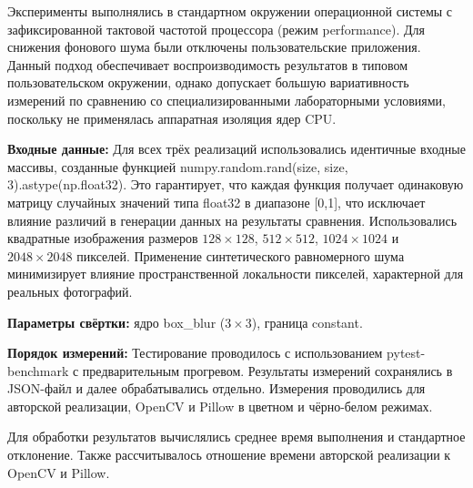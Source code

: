 \documentclass[a4paper, 12pt]{article}
\begin{document}
Эксперименты выполнялись в стандартном окружении операционной системы с зафиксированной тактовой частотой процессора (режим performance). Для снижения фонового шума были отключены пользовательские приложения. Данный подход обеспечивает воспроизводимость результатов в типовом пользовательском окружении, однако допускает большую вариативность измерений по сравнению со специализированными лабораторными условиями, поскольку не применялась аппаратная изоляция ядер CPU.

\textbf{Входные данные: } Для всех трёх реализаций использовались идентичные входные массивы, созданные функцией numpy.random.rand(size, size, 3).astype(np.float32). Это гарантирует, что каждая функция получает одинаковую матрицу случайных значений типа float32 в диапазоне [0,1], что исключает влияние различий в генерации данных на результаты сравнения. Использовались квадратные изображения размеров $128\times 128$, $512\times 512$, $1024\times 1024$ и $2048\times 2048$ пикселей. Применение синтетического равномерного шума минимизирует влияние пространственной локальности пикселей, характерной для реальных фотографий.

\textbf{Параметры свёртки: } ядро box\_blur ($3\times 3$), граница constant.

\textbf{Порядок измерений:} Тестирование проводилось с использованием pytest-benchmark с предварительным прогревом. Результаты измерений сохранялись в JSON-файл и далее обрабатывались отдельно. Измерения проводились для авторской реализации, OpenCV и Pillow в цветном и чёрно-белом режимах.

Для обработки результатов вычислялись среднее время выполнения и стандартное отклонение. Также рассчитывалось отношение времени авторской реализации к OpenCV и Pillow.
\end{document}
